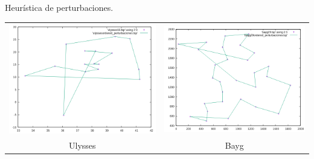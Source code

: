 \documentclass[10pt, xcolor=table]{beamer}
\begin{document}
\begin{frame}[fragile]{Heurística de perturbaciones. }
\begin{center}
\begin{tabular}{cc}
\includegraphics[scale=0.23]{./Images/ulysses_perturbaciones.png}
&
\includegraphics[scale=0.23]{./Images/bayg_perturbaciones.png} \\
Ulysses & Bayg
\end{tabular}
\end{center}
\begin{center}
\begin{tabular}{c}

\end{tabular}
\end{center}
\end{frame}
\end{document}
